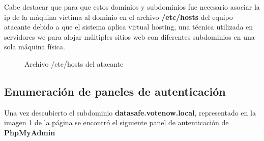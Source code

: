 \documentclass[a4paper]{article}
\begin{document}
Cabe destacar que para que estos dominios y subdominios fue necesario asociar la ip 
de la máquina víctima al dominio en el archivo \textbf{/etc/hosts} del equipo atacante
debido a que el sistema aplica virtual hosting, una técnica utilizada en servidores
we para alojar múltiples sitios web con diferentes subdominios en una sola máquina 
física.

\begin{figure}[H]
  \begin{center}
    \setlength{\fboxrule}{0.8pt}
    \caption{Archivo /etc/hosts del atacante}
    \label{fig: Identifiedsubdomains}
  \end{center}
\end{figure}


\clearpage


\subsection{Enumeración de paneles de autenticación}

Una vez descubierto el subdominio \textbf{datasafe.votenow.local}, representado en la imagen
\ref{fig: Identifiedsubdomains} de la página \pageref{fig: Identifiedsubdomains}
se encontró el siguiente panel de autenticación de \textbf{PhpMyAdmin}
\end{document}
